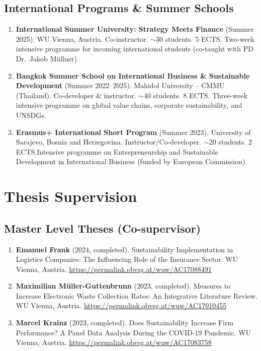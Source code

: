 \documentclass[11pt,a4paper]{article}
\begin{document}
\begin{cv}
\subsection{International Programs \& Summer Schools}
\begin{enumerate}
    \item \textbf{International Summer University: Strategy Meets Finance} (Summer 2025). WU Vienna, Austria. Co-instructor. $\sim$30 students. 5 ECTS. Two-week intensive programme for incoming international students (co-taught with PD Dr.~Jakob Müllner).
    \item \textbf{Bangkok Summer School on International Business \& Sustainable Development} (Summer 2022--2025). Mahidol University -- CMMU (Thailand). Co-developer \& instructor. $\sim$40 students. 8 ECTS. Three-week intensive programme on global value chains, corporate sustainability, and UNSDGs.
    \item \textbf{Erasmus+ International Short Program} (Summer 2023). University of Sarajevo, Bosnia and Herzegovina. Instructor/Co-developer. $\sim$20 students. 2 ECTS.Intensive programme on Entrepreneurship and Sustainable Development in International Business (funded by European Commission).
\end{enumerate}

\section{Thesis Supervision}

\subsection{Master Level Theses (Co-supervisor)}

\begin{enumerate}
    \item \textbf{Emanuel Frank} (2024, completed). Sustainability Implementation in Logistics Companies: The Influencing Role of the Insurance Sector. WU Vienna, Austria. \url{https://permalink.obvsg.at/wuw/AC17088491}
    
    \item \textbf{Maximilian Müller-Guttenbrunn} (2023, completed). Measures to Increase Electronic Waste Collection Rates: An Integrative Literature Review. WU Vienna, Austria. \url{https://permalink.obvsg.at/wuw/AC17010455}
    
    \item \textbf{Marcel Krainz} (2023, completed). Does Sustainability Increase Firm Performance? A Panel Data Analysis During the COVID-19 Pandemic. WU Vienna, Austria. \url{https://permalink.obvsg.at/wuw/AC17083758}
    

\end{enumerate}
\end{cv}
\end{document}
